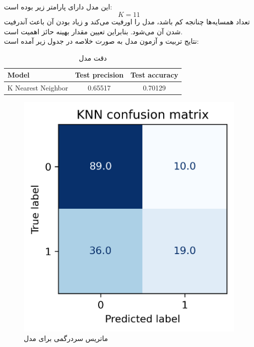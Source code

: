 \documentclass[11pt]{article}
\begin{document}
		\subsection{}
		این مدل دارای پارامتر زیر بوده است:
		$$K = 11$$
		تعداد همسایه‌ها چنانجه کم باشد، مدل را اورفیت می‌کند و زیاد بودن آن باعث آندرفیت شدن آن می‌شود. بنابراین تعیین مقدار بهینه حائز اهمیت است.\\
		نتایج تربیت و آزمون مدل به صورت خلاصه در جدول زیر آمده است:
				\begin{table}[h!]
			\caption{دقت مدل }
			\begin{latin}
				\centering
				\begin{tabular}{|l|c|c|}
					\hline
					\textbf{Model} & \textbf{Test precision} & \textbf{Test accuracy} \\ \hline
					K Nearest Neighbor & 0.65517 & 0.70129 \\ \hline
				\end{tabular}
			\end{latin}
			\label{tab:knn_results}
		\end{table}
		\begin{figure}[!h]
			\centerline{\includegraphics[width=0.5\linewidth]{../HW2_2/KNN confusion.png}}
			\caption{ماتریس سردرگمی برای مدل }
			\label{fig:confusion_knn}
		\end{figure}
		\pagebreak
\end{document}
